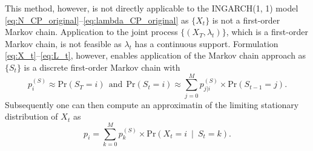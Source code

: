 \documentclass[review]{elsarticle}
\begin{document}
This method, however, is not directly applicable to the INGARCH(1, 1) model \eqref{eq:N_CP_original}--\eqref{eq:lambda_CP_original} as $\{X_t\}$ is not a first-order Markov chain. Application to the joint process $\{(X_T, \lambda_t)\}$, which is a first-order Markov chain, is not feasible as $\lambda_t$ has a continuous support. Formulation \eqref{eq:X_t}--\eqref{eq:L_t}, however, enables application of the Markov chain approach as $\{S_t\}$ is a discrete first-order Markov chain with
$$
p^{(S)}_i \approx \text{Pr}(S_T = i) \ \ \text{and} \ \ \text{Pr}(S_t = i) \approx \sum_{j = 0}^M p^{(S)}_{j|i} \times \text{Pr}(S_{t - 1} = j).
$$
Subsequently one can then compute an approximatin of the limiting stationary distribution of $X_t$ as
$$
p_i = \sum_{k = 0}^M p_k^{(S)} \times \text{Pr}(X_t = i \ \mid \ S_t = k).
$$





\end{document}
